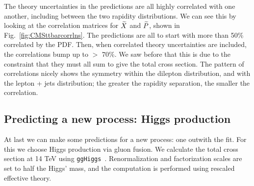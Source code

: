 The theory uncertainties in the predictions are all highly correlated with one another, including between the two rapidity distributions. We can see this by looking at the correlation matrices for $\widetilde{X}$ and $\widetilde{P}$, shown in 
Fig.~\ref{fig:CMSttbarcorrlns}. The predictions are all to start with more than 50\% correlated by the PDF. Then, when correlated theory uncertainties are included, the correlations bump up to $>$ 70\%. We saw before that this is due to the constraint that they must all sum to give the total cross section. The pattern of correlations nicely shows the symmetry within the dilepton distribution, and with the lepton + jets distribution; the greater the rapidity separation, the smaller the correlation.

\subsection{Predicting a new process: Higgs production}
At last we can make some predictions for a new process: one outwith the fit. For this we choose Higgs production via gluon fusion. We calculate the total cross section at 14 TeV using {\tt  ggHiggs}~\cite{Ball:2013bra,Bonvini:2014jma,Bonvini:2016frm}.
Renormalization and factorization scales are set to half the Higgs' mass, and the computation is performed using rescaled effective theory.

